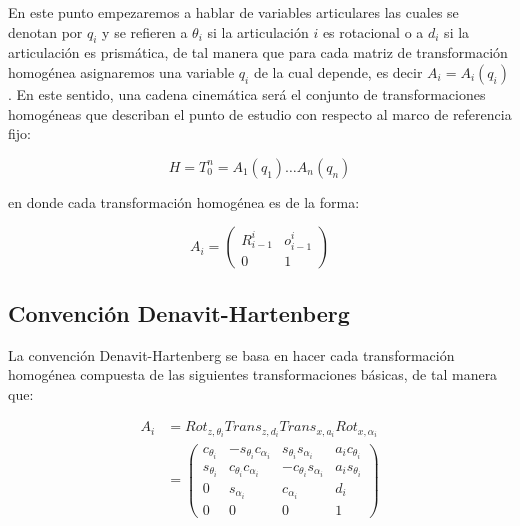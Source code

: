 \begin{multicols*}{2}
        En este punto empezaremos a hablar de variables articulares las cuales se denotan por $q_i$ y se refieren a $\theta_i$ si la articulación $i$ es rotacional o a $d_i$ si la articulación es prismática, de tal manera que para cada matriz de transformación homogénea asignaremos una variable $q_i$ de la cual depende, es decir $A_i = A_i(q_i)$. En este sentido, una cadena cinemática será el conjunto de transformaciones homogéneas que describan el punto de estudio con respecto al marco de referencia fijo:

        \begin{equation}
            H = T_0^n = A_1(q_1) \dots A_n(q_n)
        \end{equation}

        en donde cada transformación homogénea es de la forma:

        \begin{equation}
            A_i =
            \begin{pmatrix}
                R_{i-1}^i & o_{i-1}^i \\
                0 & 1
            \end{pmatrix}
        \end{equation}


        \subsection{Convención Denavit-Hartenberg}

            La convención Denavit-Hartenberg se basa en hacer cada transformación homogénea compuesta de las siguientes transformaciones básicas, de tal manera que:

            \begin{align}
                A_i &= Rot_{z, \theta_i} Trans_{z, d_i} Trans_{x, a_i} Rot_{x, \alpha_i} \nonumber \\
                &=
                \begin{pmatrix}
                    c_{\theta_i} & -s_{\theta_i} c_{\alpha_i} & s_{\theta_i} s_{\alpha_i} & a_i c_{\theta_i} \\
                    s_{\theta_i} & c_{\theta_i} c_{\alpha_i} & -c_{\theta_i} s_{\alpha_i} & a_i s_{\theta_i} \\
                    0 & s_{\alpha_i} & c_{\alpha_i} & d_i \\
                    0 & 0 & 0 & 1
                \end{pmatrix}
            \end{align}


\end{multicols*}
